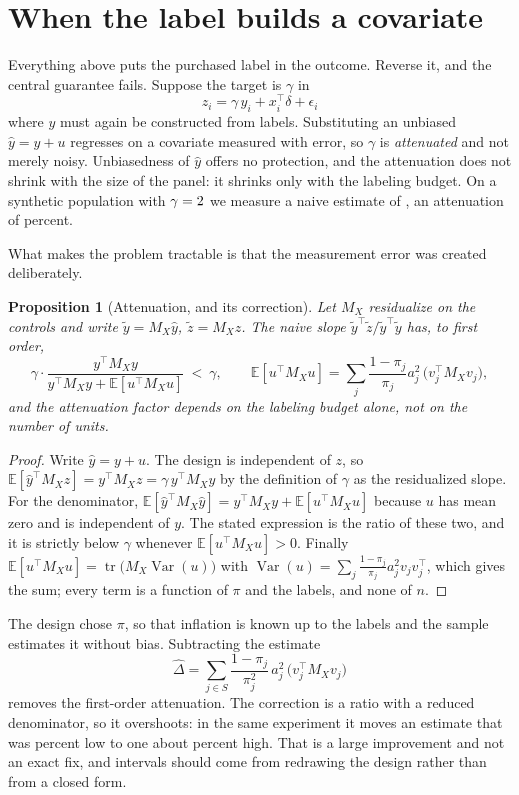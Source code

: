 \documentclass[11pt]{article}
\newcommand{\E}{\mathbb{E}}
\newcommand{\Var}{\operatorname{Var}}
\newcommand{\tr}{\operatorname{tr}}
\theoremstyle{plain}
\newtheorem{proposition}{Proposition}
\theoremstyle{remark}
\begin{document}
\section{When the label builds a covariate}
\label{sec:covariate}

Everything above puts the purchased label in the outcome. Reverse it, and the central guarantee fails. Suppose the target is $\gamma$ in
\[
z_i=\gamma\,y_i+x_i^\top\delta+\epsilon_i
\]
where $y$ must again be constructed from labels. Substituting an unbiased $\widehat y=y+u$ regresses on a covariate measured with error, so $\gamma$ is \emph{attenuated} and not merely noisy. Unbiasedness of $\widehat y$ offers no protection, and the attenuation does not shrink with the size of the panel: it shrinks only with the labeling budget. On a synthetic population with $\gamma=2$ we measure a naive estimate of \NaiveGamma{}, an attenuation of \AttenuationPct{} percent.

What makes the problem tractable is that the measurement error was created deliberately.

\begin{proposition}[Attenuation, and its correction]
\label{prop:attenuation}
Let $M_X$ residualize on the controls and write $\widetilde y=M_X\widehat y$, $\widetilde z=M_Xz$. The naive slope $\widetilde y^\top\widetilde z/\widetilde y^\top\widetilde y$ has, to first order,
\[
\gamma\cdot\frac{y^\top M_Xy}{y^\top M_Xy+\E[u^\top M_Xu]}\ <\ \gamma ,
\qquad
\E[u^\top M_Xu]=\sum_j\frac{1-\pi_j}{\pi_j}a_j^2\,\bigl(v_j^\top M_Xv_j\bigr),
\]
and the attenuation factor depends on the labeling budget alone, not on the number of units.
\end{proposition}

\begin{proof}
Write $\widehat y=y+u$. The design is independent of $z$, so $\E[\widehat y^\top M_Xz]=y^\top M_Xz=\gamma\,y^\top M_Xy$ by the definition of $\gamma$ as the residualized slope. For the denominator, $\E[\widehat y^\top M_X\widehat y]=y^\top M_Xy+\E[u^\top M_Xu]$ because $u$ has mean zero and is independent of $y$. The stated expression is the ratio of these two, and it is strictly below $\gamma$ whenever $\E[u^\top M_Xu]>0$. Finally $\E[u^\top M_Xu]=\tr\bigl(M_X\Var(u)\bigr)$ with $\Var(u)=\sum_j\frac{1-\pi_j}{\pi_j}a_j^2v_jv_j^\top$, which gives the sum; every term is a function of $\pi$ and the labels, and none of $n$.
\end{proof}

The design chose $\pi$, so that inflation is known up to the labels and the sample estimates it without bias. Subtracting the estimate
\[
\widehat{\Delta}=\sum_{j\in S}\frac{1-\pi_j}{\pi_j^2}\,a_j^2\,\bigl(v_j^\top M_X v_j\bigr)
\]
removes the first-order attenuation. The correction is a ratio with a reduced denominator, so it overshoots: in the same experiment it moves an estimate that was \AttenuationPct{} percent low to one about \OvershootPct{} percent high. That is a large improvement and not an exact fix, and intervals should come from redrawing the design rather than from a closed form.
\end{document}
